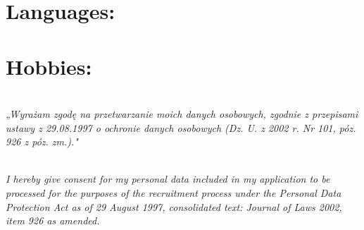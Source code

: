 \documentclass[10pt,a4paper,sans]{moderncv}
\begin{document}
\section{Languages:}
\section{Hobbies:}
\hfill

\textit{\\„Wyrażam zgodę na przetwarzanie moich danych osobowych, zgodnie z przepisami ustawy z 29.08.1997 o ochronie danych osobowych (Dz. U. z 2002 r. Nr 101, póz. 926 z póz. zm.)."} 

\textit{\\I hereby give consent for my personal data included in my application to be processed for the purposes of the recruitment process under the Personal Data Protection Act as of 29 August 1997, consolidated text: Journal of Laws 2002, item 926 as amended.}
\end{document}
